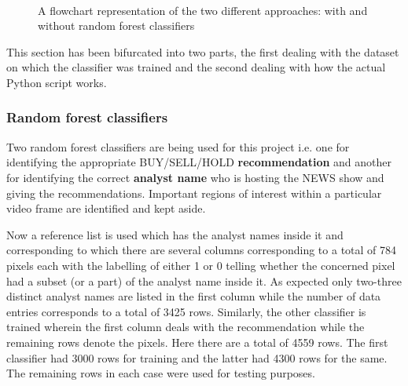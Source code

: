 \begin{figure}[h]
  \centering
   \\
  \vspace{1.5cm}
  \caption{A flowchart representation of the two different approaches: with and without random forest classifiers}
  \label{fig:not_rf_and_rf}
\end{figure}

This section has been bifurcated into two parts, the first dealing with the dataset on which the classifier was trained and the second dealing with how the actual Python script works.

\subsubsection{Random forest classifiers}
Two random forest classifiers are being used for this project i.e. one for identifying the appropriate BUY/SELL/HOLD \textbf{recommendation} and another for identifying the correct \textbf{analyst name} who is hosting the NEWS show and giving the recommendations. Important regions of interest within a particular video frame are identified and kept aside. \par

Now a reference list is used which has the analyst names inside it and corresponding to which there are several columns corresponding to a total of 784 pixels each with the labelling of either 1 or 0 telling whether the concerned pixel had a subset (or a part) of the analyst name inside it. As expected only two-three distinct analyst names are listed in the first column while the number of data entries corresponds to a total of 3425 rows. Similarly, the other classifier is trained wherein the first column deals with the recommendation while the remaining rows denote the pixels. Here there are a total of 4559 rows. The first classifier had 3000 rows for training and the latter had 4300 rows for the same. The remaining rows in each case were used for testing purposes. \par

